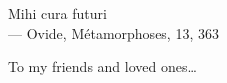 \cleardoublepage
\thispagestyle{empty}


\vspace*{3cm}

\begin{raggedleft}
    	Mihi cura futuri\\
     --- Ovide, Métamorphoses, 13, 363\\
\end{raggedleft}

\vspace{4cm}

\begin{center}
    To my friends and loved ones\dots
\end{center}


